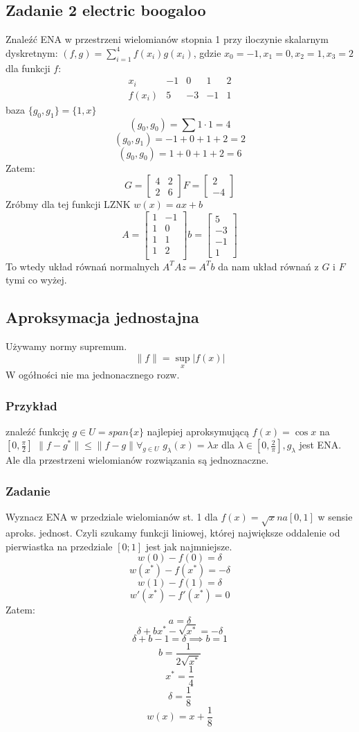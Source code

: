\documentclass{article}
\begin{document}
\subsection{Zadanie 2 electric boogaloo}
Znaleźć ENA w przestrzeni wielomianów stopnia 1 przy iloczynie skalarnym dyskretnym: $ (f,g)=\sum_{i=1}^{4}f(x_i)g(x_i) $, gdzie $ x_0=-1, x_1=0, x_2=1, x_3=2 $ dla funkcji $ f: $
$$\begin{array}{c|c|c|c|c|}
x_i&-1&0&1&2\\
\hline
f(x_i)&5&-3&-1&1
\end{array}$$
baza $ \{g_0,g_1\}=\{1,x\} $
$$(g_0,g_0)=\sum 1\cdot 1=4$$
$$(g_0,g_1)=-1+0+1+2=2$$
$$(g_0,g_0)=1+0+1+2=6$$
Zatem:
$$
G=\begin{bmatrix}
4&2\\
2&6
\end{bmatrix}
F=\begin{bmatrix}
2\\
-4
\end{bmatrix}
$$
Zróbmy dla tej funkcji LZNK
$ w(x)=ax+b $
$$A=\begin{bmatrix}
1&-1\\1&0\\1&1\\1&2\\
\end{bmatrix}
b=\begin{bmatrix}
5\\-3\\-1\\1
\end{bmatrix}
$$
To wtedy układ równań normalnych $ A^TAz=A^Tb $ da nam układ równań z $ G $ i $ F $ tymi co wyżej.
\subsection{Aproksymacja jednostajna}
Używamy normy supremum.
$$\|f\|=\sup_x |f(x)|$$
W ogółności nie ma jednonacznego rozw.
\subsubsection{Przykład}
znaleźć funkcję $ g\in U=span\{x\} $ najlepiej aproksymującą $ f(x)=\cos x$ na $ [0,\frac\pi2] $
$\|f-g^*\|\le \|f-g\|\forall_{g\in U}$
$g_\lambda(x)=\lambda x$
dla $\lambda\in[0,\frac2\pi], g_\lambda$ jest ENA.\\
Ale dla przestrzeni wielomianów rozwiązania są jednoznaczne.
\subsubsection{Zadanie}
Wyznacz ENA w przedziale wielomianów st. 1 dla $ f(x)=\sqrt x na [0,1]  $ w sensie aproks. jednost.
Czyli szukamy funkcji liniowej, której największe oddalenie od pierwiastka na przedziale $ [0;1] $ jest jak najmniejsze.
$$w(0)-f(0)=\delta$$
$$w(x^*)-f(x^*)=-\delta$$
$$w(1)-f(1)=\delta$$
$$w'(x^*)-f'(x^*)=0$$
Zatem:
$$a=\delta$$
$$\delta+bx^*-\sqrt{x^*}=-\delta$$
$$\delta+b-1=\delta\implies b=1$$
$$b=\frac{1}{2\sqrt{x^*}}$$
$$x^*=\frac14$$
$$\delta=\frac18$$
$$w(x)=x+\frac18$$
\end{document}
